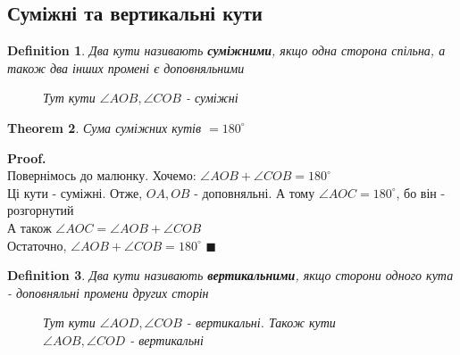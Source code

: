 \documentclass[a4paper, 14pt]{extarticle}
\theoremstyle{theoremdd}
\newtheorem{theorem}{Theorem}[subsection]
\theoremstyle{theoremdd}
\newtheorem{definition}[theorem]{Definition}
\theoremstyle{theoremdd}
\theoremstyle{theoremdd}
\theoremstyle{theoremdd}
\theoremstyle{theoremdd}
\theoremstyle{theoremdd}
\theoremstyle{theoremdd}
\newenvironment{pf}{\vspace*{-3mm} \textbf{Proof. \\}}{$\blacksquare$}
\begin{document}
\subsection{Суміжні та вертикальні кути}
\begin{definition}
Два кути називають \textbf{суміжними}, якщо одна сторона спільна, а також два інших промені є доповняльними
\begin{figure}[H]
\centering
{}
\caption*{Тут кути $\angle AOB, \angle COB$ - суміжні}
\end{figure}
\end{definition}

\begin{theorem}
Сума суміжних кутів $= 180^{\circ}$
\end{theorem}

\begin{pf}
Повернімось до малюнку. Хочемо: $\angle AOB + \angle COB = 180^{\circ}$\\
Ці кути - суміжні. Отже, $OA,OB$ - доповняльні. А тому $\angle AOC = 180^{\circ}$, бо він - розгорнутий\\
А також $\angle AOC = \angle AOB + \angle COB$\\
Остаточно, $\angle AOB + \angle COB = 180^{\circ}$
\end{pf}

\begin{definition}
Два кути називають \textbf{вертикальними}, якщо сторони одного кута - доповняльні промени других сторін
\begin{figure}[H]
\centering
{}
\caption*{Тут кути $\angle AOD, \angle COB$ - вертикальні. Також кути $\angle AOB, \angle COD$ - вертикальні}
\end{figure}
\end{definition}
\end{document}
